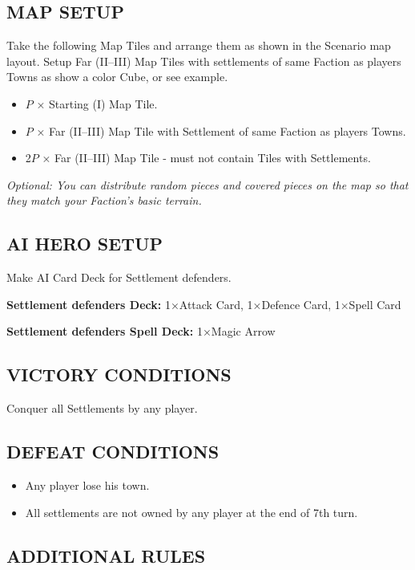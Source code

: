 \begin{multicols}{2}
\subsection*{\MakeUppercase{Map Setup}}

Take the following Map Tiles and arrange them as shown in the Scenario map layout.
Setup Far (II--III) Map Tiles with settlements of same Faction as players Towns as show a color Cube, or see example.

\begin{itemize}
  \item $P$ × Starting (I) Map Tile.
  \item $P$ × Far (II--III) Map Tile with Settlement of same Faction as players Towns.
  \item 2$P$ × Far (II--III) Map Tile - must not contain Tiles with Settlements.
\end{itemize}

\textit{Optional: You can distribute random pieces and covered pieces on the map so that they match your Faction's basic terrain.}

\subsection*{\MakeUppercase{AI Hero Setup}}

Make AI Card Deck for Settlement defenders.

\textbf{Settlement defenders Deck:} 1×Attack Card, 1×Defence Card, 1×Spell Card

\textbf{Settlement defenders Spell Deck:} 1×Magic Arrow

\subsection*{\MakeUppercase{Victory Conditions}}
Conquer all Settlements by any player.

\subsection*{\MakeUppercase{Defeat Conditions}}

\begin{itemize}
  \item Any player lose his town.
  \item All settlements are not owned by any player at the end of 7th turn.
\end{itemize}

\subsection*{\MakeUppercase{Additional Rules}}


\end{multicols}
